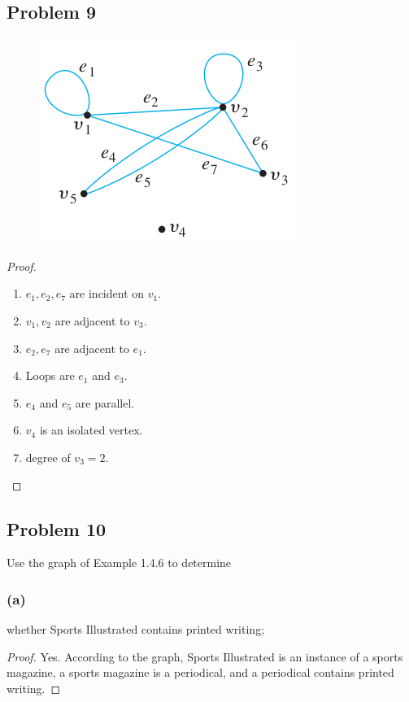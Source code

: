 \documentclass[14pt]{extarticle}
\begin{document}
\subsection{Problem 9}

\begin{figure}[ht!]
\centering
\includegraphics[scale=0.6]{../images/1.4.9.png}
\end{figure}

\begin{proof}
\begin{enumerate}
\item $e_1, e_2, e_7$ are incident on $v_1$.
\item $v_1, v_2$ are adjacent to $v_3$.
\item $e_2, e_7$ are adjacent to $e_1$.
\item Loops are $e_1$ and $e_3$.
\item $e_4$ and $e_5$ are parallel.
\item $v_4$ is an isolated vertex.
\item degree of $v_3 = 2$.
\end{enumerate}
\end{proof}

\subsection{Problem 10}
Use the graph of Example 1.4.6 to determine

\subsubsection{(a)}
whether Sports Illustrated contains printed writing;

\begin{proof}
Yes. According to the graph, Sports Illustrated is an instance of a sports
magazine, a sports magazine is a periodical, and a periodical contains printed
writing.
\end{proof}
\end{document}

